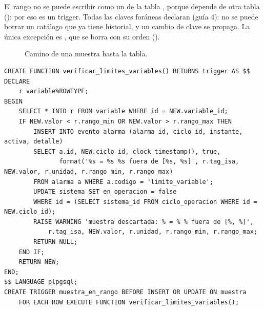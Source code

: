 \documentclass[a4paper,11pt]{article}
\begin{document}
El rango no se puede escribir como un  de la tabla , porque depende de otra tabla (): por eso es un trigger. Todas las claves foráneas declaran  (guía 4): no se puede borrar un catálogo que ya tiene historial, y un cambio de clave se propaga. La única excepción es , que se borra con su orden ().

\begin{figure}[H]
\centering
{}
\caption{Camino de una muestra hasta la tabla.}
\end{figure}

\begin{lstlisting}[style=sql, caption={Trigger de seguridad (\codigo{brazo\_4gdl.sql}).}]
CREATE FUNCTION verificar_limites_variables() RETURNS trigger AS $$
DECLARE
    r variable%ROWTYPE;
BEGIN
    SELECT * INTO r FROM variable WHERE id = NEW.variable_id;
    IF NEW.valor < r.rango_min OR NEW.valor > r.rango_max THEN
        INSERT INTO evento_alarma (alarma_id, ciclo_id, instante, activa, detalle)
        SELECT a.id, NEW.ciclo_id, clock_timestamp(), true,
               format('%s = %s %s fuera de [%s, %s]', r.tag_isa, NEW.valor, r.unidad, r.rango_min, r.rango_max)
        FROM alarma a WHERE a.codigo = 'limite_variable';
        UPDATE sistema SET en_operacion = false
        WHERE id = (SELECT sistema_id FROM ciclo_operacion WHERE id = NEW.ciclo_id);
        RAISE WARNING 'muestra descartada: % = % % fuera de [%, %]',
            r.tag_isa, NEW.valor, r.unidad, r.rango_min, r.rango_max;
        RETURN NULL;
    END IF;
    RETURN NEW;
END;
$$ LANGUAGE plpgsql;
CREATE TRIGGER muestra_en_rango BEFORE INSERT OR UPDATE ON muestra
    FOR EACH ROW EXECUTE FUNCTION verificar_limites_variables();
\end{lstlisting}
\end{document}
